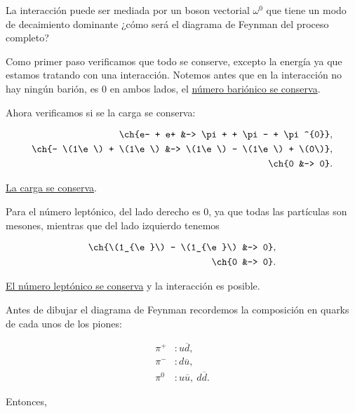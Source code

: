 \documentclass[./../main.tex]{subfiles}
\begin{document}
    \begin{exercise}
        La interacción  puede ser mediada por un boson vectorial \(\omega^{0}\) que tiene un modo de decaimiento dominante  ¿cómo será el diagrama de Feynman del proceso completo?

        \begin{solution}
            Como primer paso verificamos que todo se conserve, excepto la energía ya que estamos tratando con una interacción. Notemos antes que en la interacción no hay ningún barión, es 0 en ambos lados, \idest el \ul{número bariónico se conserva}.

            Ahora verificamos si se la carga se conserva:

            \begin{align*}
                \ch{e- + e+ &-> \pi+ + \pi- + \pi^{0}},\\
                \ch{- \(1\e\) + \(1\e\) &-> \(1\e\) - \(1\e\) + \(0\)},\\
                \ch{0 &-> 0}.
            \end{align*}

            \ul{La carga se conserva}.

            Para el número leptónico, del lado derecho es 0, ya que todas las partículas son mesones, mientras que del lado izquierdo tenemos

            \begin{align*}
                \ch{\(1_{\e}\) - \(1_{\e}\) &-> 0},\\
                \ch{0 &-> 0}.
            \end{align*}

            \ul{El número leptónico se conserva} y la interacción es posible.

            Antes de dibujar el diagrama de Feynman recordemos la composición en quarks de cada unos de los piones:

            \begin{align*}
                \pi^{+} &: u\overline{d},\\
                \pi^{-} &: d\overline{u},\\
                \pi^{0} &: u\overline{u},\ d\overline{d}.
            \end{align*}

            \pagebreak
            Entonces,


\end{solution}
\end{exercise}
\end{document}
